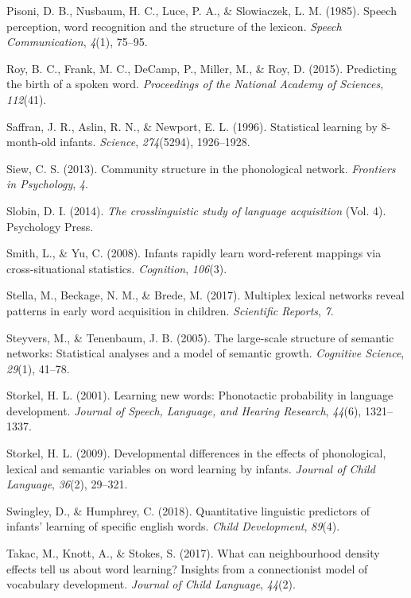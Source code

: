 \documentclass[english,floatsintext,man]{apa6}
\theoremstyle{definition}
\theoremstyle{definition}
\theoremstyle{definition}
\theoremstyle{remark}
\begin{document}
\hypertarget{ref-pisoni1985}{}
Pisoni, D. B., Nusbaum, H. C., Luce, P. A., \& Slowiaczek, L. M. (1985).
Speech perception, word recognition and the structure of the lexicon.
\emph{Speech Communication}, \emph{4}(1), 75--95.

\hypertarget{ref-roy2015}{}
Roy, B. C., Frank, M. C., DeCamp, P., Miller, M., \& Roy, D. (2015).
Predicting the birth of a spoken word. \emph{Proceedings of the National
Academy of Sciences}, \emph{112}(41).

\hypertarget{ref-saffran1996}{}
Saffran, J. R., Aslin, R. N., \& Newport, E. L. (1996). Statistical
learning by 8-month-old infants. \emph{Science}, \emph{274}(5294),
1926--1928.

\hypertarget{ref-siew2013}{}
Siew, C. S. (2013). Community structure in the phonological network.
\emph{Frontiers in Psychology}, \emph{4}.

\hypertarget{ref-slobin2014}{}
Slobin, D. I. (2014). \emph{The crosslinguistic study of language
acquisition} (Vol. 4). Psychology Press.

\hypertarget{ref-smith2008}{}
Smith, L., \& Yu, C. (2008). Infants rapidly learn word-referent
mappings via cross-situational statistics. \emph{Cognition},
\emph{106}(3).

\hypertarget{ref-stella2017}{}
Stella, M., Beckage, N. M., \& Brede, M. (2017). Multiplex lexical
networks reveal patterns in early word acquisition in children.
\emph{Scientific Reports}, \emph{7}.

\hypertarget{ref-steyvers2005}{}
Steyvers, M., \& Tenenbaum, J. B. (2005). The large-scale structure of
semantic networks: Statistical analyses and a model of semantic growth.
\emph{Cognitive Science}, \emph{29}(1), 41--78.

\hypertarget{ref-storkel2001}{}
Storkel, H. L. (2001). Learning new words: Phonotactic probability in
language development. \emph{Journal of Speech, Language, and Hearing
Research}, \emph{44}(6), 1321--1337.

\hypertarget{ref-storkel2009}{}
Storkel, H. L. (2009). Developmental differences in the effects of
phonological, lexical and semantic variables on word learning by
infants. \emph{Journal of Child Language}, \emph{36}(2), 29--321.

\hypertarget{ref-swingley2018}{}
Swingley, D., \& Humphrey, C. (2018). Quantitative linguistic predictors
of infants' learning of specific english words. \emph{Child
Development}, \emph{89}(4).

\hypertarget{ref-takac2017}{}
Takac, M., Knott, A., \& Stokes, S. (2017). What can neighbourhood
density effects tell us about word learning? Insights from a
connectionist model of vocabulary development. \emph{Journal of Child
Language}, \emph{44}(2).
\end{document}
